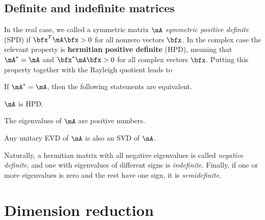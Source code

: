 \begin{exam*}
\end{exam*}

\subsection{Definite and indefinite matrices}

In the real case, we called a symmetric matrix $\mA$ \emph{symmetric positive definite} (SPD)
if $\bfx^T \mA\bfx > 0 $ for all nonzero vectors $\bfx$. In the complex case the relevant property is  \textbf{hermitian positive definite} (HPD), meaning that $\mA^*=\mA$ and $\bfx^* \mA\bfx > 0$ for all complex vectors $\bfx$. Putting this property together with the Rayleigh quotient leads to
\begin{thm}
  \label{thm:hpd} If $\mA^*=\mA$, then the following statements are equivalent.
  \begin{remunerate}
  \item $\mA$ is HPD.
  \item The eigenvalues of $\mA$ are positive numbers.
  \item Any unitary EVD of $\mA$ is also an SVD of $\mA$.
  \end{remunerate}
\end{thm}

Naturally, a hermitian matrix with all negative eigenvalues is called \emph{negative definite}, and one with eigenvalues of different signs is \emph{indefinite}. Finally, if one or more eigenvalues is zero and the rest have one sign, it is \emph{semidefinite}.


\begin{exercises}
  
\end{exercises}


\clearpage
\section{Dimension reduction}
\label{sec:dimreduce}

